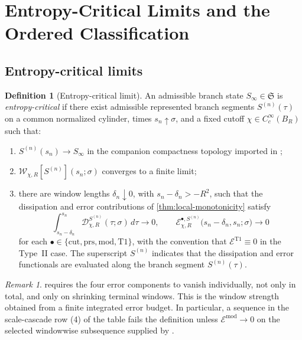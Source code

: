 \documentclass[11pt]{amsart}
\numberwithin{equation}{section}
\theoremstyle{plain}
\theoremstyle{definition}
\newtheorem{definition}[theorem]{Definition}
\theoremstyle{remark}
\newtheorem{remark}[theorem]{Remark}
\newcommand{\Wloc}{\mathcal W}
\newcommand{\Diss}{\mathcal D}
\newcommand{\Err}{\mathcal E}
\newcommand{\State}{\mathfrak S}
\begin{document}
\section{Entropy-Critical Limits and the Ordered Classification}
\label{sec:critical}

\subsection{Entropy-critical limits}

\begin{definition}[Entropy-critical limit]
\label{def:entropy-critical}
An admissible branch state \(S_\infty\in\State\) is \emph{entropy-critical}
if there exist admissible represented branch segments \(S^{(n)}(\tau)\) on a
common normalized cylinder, times \(s_n\uparrow\sigma\), and a fixed cutoff
\(\chi\in C_c^\infty(B_R)\) such that:
\begin{enumerate}[label=\textup{(\roman*)},leftmargin=2.2em]
		\item \(S^{(n)}(s_n)\to S_\infty\) in the companion compactness topology
		imported in
		;
	\item \(\Wloc_{\chi,R}[S^{(n)}](s_n;\sigma)\) converges to a finite limit;
	\item there are window lengths \(\delta_n\downarrow0\), with
	\(s_n-\delta_n>-R^2\), such that the dissipation and error contributions
	of \cref{thm:local-monotonicity} satisfy
	\begin{equation}\label{eq:critical-vanishing}
		\int_{s_n-\delta_n}^{s_n}
		\Diss_{\chi,R}^{S^{(n)}}(\tau;\sigma)\,d\tau\to0,
		\qquad
		\Err^{\bullet,S^{(n)}}_{\chi,R}
		\bigl(s_n-\delta_n,s_n;\sigma\bigr)\to0
	\end{equation}
	for each \(\bullet\in\{\mathrm{cut},\mathrm{prs},\mathrm{mod},\mathrm{T1}\}\),
	with the convention that \(\Err^{\mathrm{T1}}\equiv0\) in the Type~II case.
	The superscript \(S^{(n)}\) indicates that the dissipation and error
	functionals are evaluated along the branch segment \(S^{(n)}(\tau)\).
\end{enumerate}
\end{definition}

\begin{remark}
 requires the four error components to vanish
individually, not only in total, and only on shrinking terminal windows.  This
is the window strength obtained from a finite integrated error budget.  In
particular, a sequence in the scale-cascade row (4) of the table fails the
definition unless \(\Err^{\mathrm{mod}}\to0\) on the selected windowwise
subsequence supplied by .
\end{remark}
\end{document}
